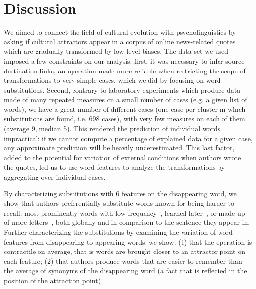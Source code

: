 \section{Discussion}

\begin{new}

We  aimed to connect the field of cultural evolution with psycholinguistics by asking if cultural attractors appear in a corpus of online news-related quotes which are gradually transformed by low-level biases.
The data set we used imposed a few constraints on our analysis:
first, it was necessary to infer source-destination links, an operation made more reliable when restricting the scope of transformations to very simple cases, which we did by focusing on word substitutions.
Second, contrary to laboratory experiments which produce data made of many repeated measures on a small number of cases (\hbox{e.g.} a given list of words), we have a great number of different cases (one case per cluster in which substitutions are found, \hbox{i.e.} 698 cases), with very few measures on each of them (average 9, median 5).
This rendered the prediction of individual words impractical: if we cannot compute a percentage of explained data for a given case, any approximate prediction will be heavily underestimated.
This last factor, added to the potential for variation of external conditions when authors wrote the quotes, led us to use word features to analyze the transformations by aggregating over individual cases.

By characterizing substitutions with 6 features on the disappearing word, we show that authors preferentially substitute words known for being harder to recall:
most prominently words with low frequency~\citep{gregg_word_1976}, learned later~\citep{dewhurst_separate_1998}, or made up of more letters~\citep{nickels_dissociating_2004}, both globally and in comparison to the sentence they appear in.
Further characterizing the substitutions by examining the variation of word features from disappearing to appearing words, we show:
(1) that the operation is contractile on average, that is words are brought closer to an attractor point on each feature;
(2) that authors produce words that are easier to remember than the average of synonyms of the disappearing word (a fact that is reflected in the position of the attraction point).


\end{new}
